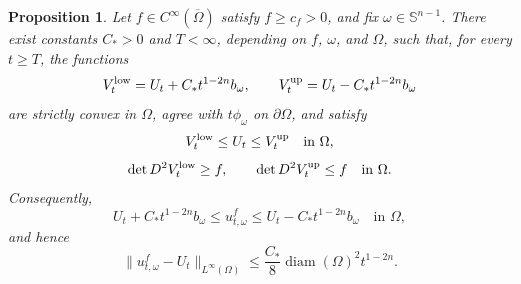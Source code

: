 \documentclass[11pt]{article}
\numberwithin{equation}{section}
\newtheorem{proposition}[theorem]{Proposition}
\newcommand{\Sn}{\mathbb S^{n-1}}
\begin{document}
\begin{proposition}\label{prop:comparison-barriers}
Let \(f\in C^\infty(\overline\Omega)\) satisfy \(f\ge c_f>0\), and fix \(\omega\in\Sn\).  There exist constants \(C_*>0\) and \(T<\infty\), depending on \(f\), \(\omega\), and \(\Omega\), such that, for every \(t\ge T\), the functions
\begin{equation}\label{eq:lower-upper-barriers}
    V_t^{\rm low}
    =U_t+C_*t^{1-2n}b_\omega,
    \qquad
    V_t^{\rm up}
    =U_t-C_*t^{1-2n}b_\omega
\end{equation}
are strictly convex in \(\Omega\), agree with \(t\phi_\omega\) on \(\partial\Omega\), and satisfy
\begin{equation}\label{eq:barrier-order-around-U}
    V_t^{\rm low}\le U_t\le V_t^{\rm up}
    \quad\text{in }\Omega,
\end{equation}
\begin{equation}\label{eq:barrier-det-inequalities}
    \det D^2V_t^{\rm low}\ge f,
    \qquad
    \det D^2V_t^{\rm up}\le f
    \quad\text{in }\Omega .
\end{equation}
Consequently,
\begin{equation}\label{eq:global-C0-asymptotic}
    U_t+C_*t^{1-2n}b_\omega
    \le
    u_{t,\omega}^f
    \le
    U_t-C_*t^{1-2n}b_\omega
    \quad\text{in }\Omega,
\end{equation}
and hence
\begin{equation}\label{eq:global-C0-asymptotic-bound}
    \|u_{t,\omega}^f-U_t\|_{L^\infty(\Omega)}
    \le
    \frac{C_*}{8}\operatorname{diam}(\Omega)^2 t^{1-2n}.
\end{equation}
\end{proposition}
\end{document}
